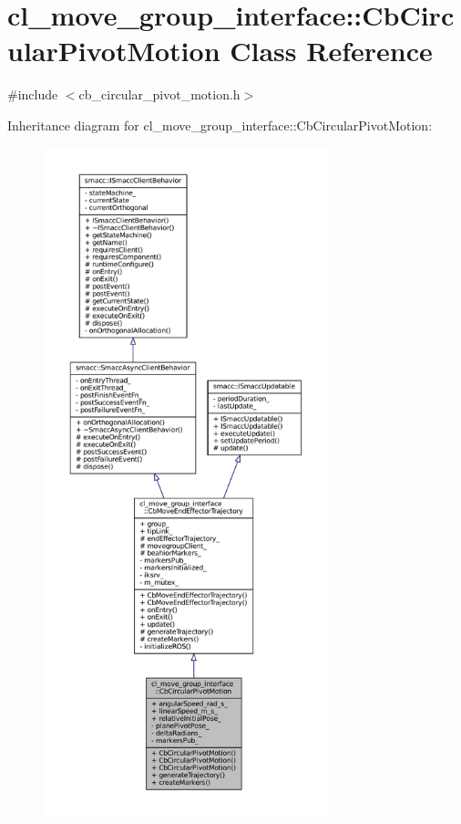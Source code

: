 \hypertarget{classcl__move__group__interface_1_1CbCircularPivotMotion}{}\section{cl\+\_\+move\+\_\+group\+\_\+interface\+:\+:Cb\+Circular\+Pivot\+Motion Class Reference}
\label{classcl__move__group__interface_1_1CbCircularPivotMotion}


{\ttfamily \#include $<$cb\+\_\+circular\+\_\+pivot\+\_\+motion.\+h$>$}



Inheritance diagram for cl\+\_\+move\+\_\+group\+\_\+interface\+:\+:Cb\+Circular\+Pivot\+Motion\+:
\nopagebreak
\begin{figure}[H]
\begin{center}
\leavevmode
\includegraphics[height=550pt]{classcl__move__group__interface_1_1CbCircularPivotMotion__inherit__graph}
\end{center}
\end{figure}


